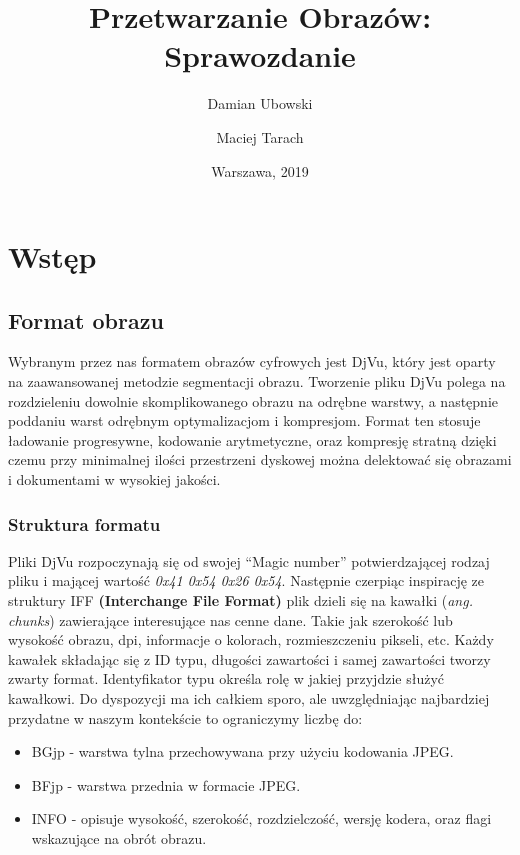 \documentclass[a4paper,12pt]{book}
\title{\Large{\textbf{Przetwarzanie Obrazów: Sprawozdanie}}}
\author{
	Damian Ubowski
	\and
	Maciej Tarach
}
\date{Warszawa, 2019}
\begin{document}
\maketitle
\tableofcontents
\chapter{Wstęp}
\section{Format obrazu}
Wybranym przez nas formatem obrazów cyfrowych jest DjVu, który jest oparty na zaawansowanej metodzie segmentacji obrazu. Tworzenie pliku DjVu polega na rozdzieleniu dowolnie skomplikowanego obrazu na odrębne warstwy, a następnie poddaniu warst odrębnym optymalizacjom i kompresjom. Format ten stosuje ładowanie progresywne, kodowanie arytmetyczne, oraz kompresję stratną dzięki czemu przy minimalnej ilości przestrzeni dyskowej można delektować się obrazami i dokumentami w wysokiej jakości. 
\subsection{Struktura formatu}
Pliki DjVu rozpoczynają się od swojej ``Magic number'' potwierdzającej rodzaj pliku i mającej wartość \textit{0x41 0x54 0x26 0x54}. Następnie czerpiąc inspirację ze struktury IFF \textbf{(Interchange File Format)} plik dzieli się na kawałki (\textit{ang. chunks}) zawierające interesujące nas cenne dane. Takie jak szerokość lub wysokość obrazu, dpi, informacje o kolorach, rozmieszczeniu pikseli, etc. Każdy kawałek składając się z ID typu, długości zawartości i samej zawartości tworzy zwarty format. Identyfikator typu określa rolę w jakiej przyjdzie służyć kawałkowi. Do dyspozycji ma ich całkiem sporo, ale uwzględniając najbardziej przydatne w naszym kontekście to ograniczymy liczbę do: 
\renewcommand{\labelitemi}{$*$}
\begin{itemize}
	\item BGjp - warstwa tylna przechowywana przy użyciu kodowania JPEG. 
	\item BFjp - warstwa przednia w formacie JPEG. 
	\item INFO - opisuje wysokość, szerokość, rozdzielczość, wersję kodera, oraz flagi wskazujące na obrót obrazu. 
\end{itemize}
\end{document}
